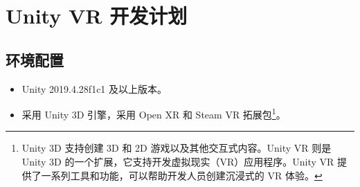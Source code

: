 \documentclass[letterpaper,10pt]{article}
\begin{document}
%				
%				
%				
%				
%				
%				
	
	\section{Unity VR 开发计划}
	
	\subsection{环境配置}
	
	\begin{itemize}
		\item [(1)] 
		Unity 2019.4.28f1c1 及以上版本。
		
		\item [(2)]
		采用 Unity 3D 引擎，采用 Open XR 和 Steam VR 拓展包\footnote{Unity 3D 支持创建 3D 和 2D 游戏以及其他交互式内容。Unity VR 则是 Unity 3D 的一个扩展，它支持开发虚拟现实（VR）应用程序。Unity VR 提供了一系列工具和功能，可以帮助开发人员创建沉浸式的 VR 体验。}。
	\end{itemize}
\end{document}
